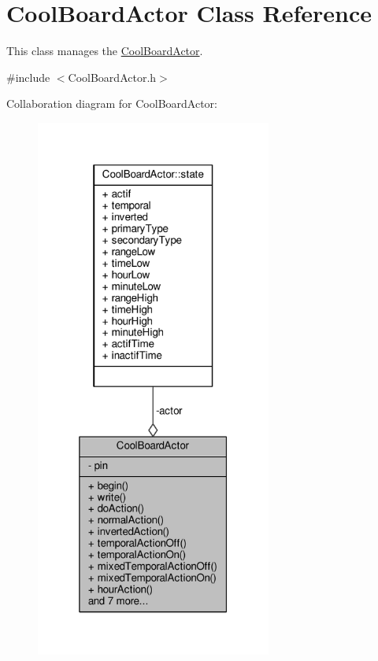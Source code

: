 \hypertarget{class_cool_board_actor}{}\section{Cool\+Board\+Actor Class Reference}
\label{class_cool_board_actor}


This class manages the \hyperlink{class_cool_board_actor}{Cool\+Board\+Actor}.  




{\ttfamily \#include $<$Cool\+Board\+Actor.\+h$>$}



Collaboration diagram for Cool\+Board\+Actor\+:
\nopagebreak
\begin{figure}[H]
\begin{center}
\leavevmode
\includegraphics[width=220pt]{d6/d3e/class_cool_board_actor__coll__graph}
\end{center}
\end{figure}
